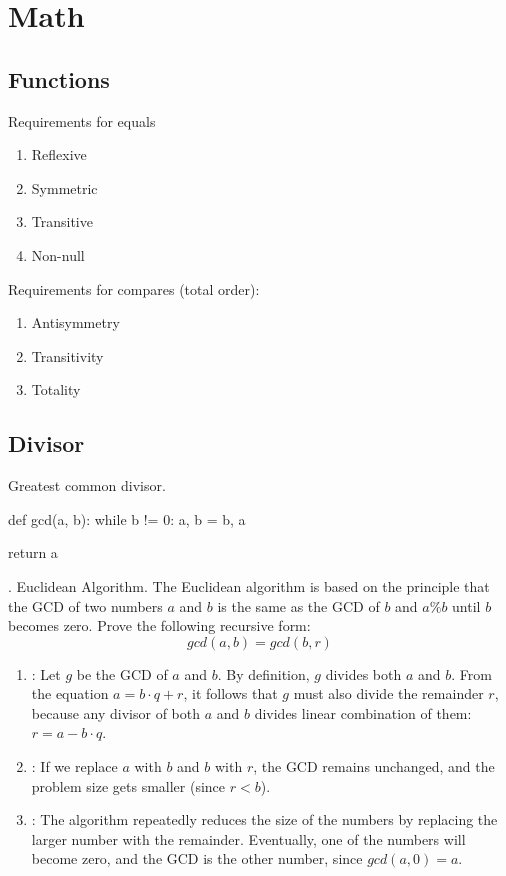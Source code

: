\chapter{Math}

\section{Functions}
 Requirements for equals
\begin{enumerate}
\item Reflexive
\item Symmetric
\item Transitive
\item Non-null
\end{enumerate}
 Requirements for compares (total order):
\begin{enumerate}
\item Antisymmetry
\item Transitivity
\item Totality
\end{enumerate}
\section{Divisor}
 Greatest common divisor.

\begin{python}
def gcd(a, b):
    while b != 0:
        a, b = b, a %

    return a
\end{python}

. Euclidean Algorithm. The Euclidean algorithm is based on the principle that the GCD of two numbers $a$ and $b$ is the same as the GCD of $b$ and $a\%b$ until $b$ becomes zero. Prove the following recursive form:
$$
gcd(a,b) = gcd(b, r)
$$
\begin{enumerate}
\item {}: Let $g$ be the GCD of $a$ and $b$. By definition, $g$ divides both $a$ and $b$. From the equation $a=b\cdot q+r$, it follows that $g$ must also divide the remainder $r$, because any divisor of both $a$ and $b$ divides linear combination of them: $r = a - b \cdot q$. 
\item {}: If we replace $a$ with $b$ and $b$ with $r$, the GCD remains unchanged, and the problem size gets smaller (since $r<b$). 
\item {}: The algorithm repeatedly reduces the size of the numbers by replacing the larger number with the remainder. Eventually, one of the numbers will become zero, and the GCD is the other number, since $gcd(a,0)=a$.
\end{enumerate}


